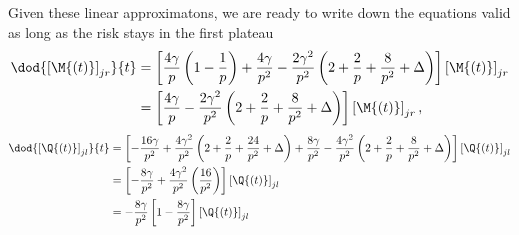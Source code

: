 Given these linear approximatons, we are ready to write down the equations valid 
as long as the risk stays in the first plateau
\begin{equation}\label{eq:Msphericalgenericpk1}\begin{split}
  \dod{\left[\M{\left(t\right)}\right]_{jr}}{t} &= 
    \left[
      \frac{4 \gamma}{p} \left(1 - \frac{1}{p}\right)
      +\frac{4 \gamma}{p^2}-\frac{2 \gamma^2}{p^2} \left(2 +\frac{2}{p} + \frac{8}{p^2} + \Delta \right)
    \right] \left[\M{\left(t\right)}\right]_{jr} \\
    &= \left[
      \frac{4 \gamma}{p} -\frac{2 \gamma^2}{p^2} \left(2 +\frac{2}{p} + \frac{8}{p^2} + \Delta \right)
    \right] \left[\M{\left(t\right)}\right]_{jr},
\end{split}\end{equation}
\begin{equation}\label{eq:Qsphericalgenericpk1}\begin{split}
  \dod{\left[\Q{\left(t\right)}\right]_{jl}}{t} &= 
    \left[
      -\frac{16 \gamma}{p^2} +\frac{4 \gamma^2}{p^2} \left(2 +\frac{2}{p} + \frac{24}{p^2} + \Delta \right)
      +\frac{8  \gamma}{p^2} -\frac{4 \gamma^2}{p^2}  \left(2 +\frac{2}{p} + \frac{8}{p^2} + \Delta \right)
    \right] \left[\Q{\left(t\right)}\right]_{jl} \\
  &= \left[
    -\frac{8 \gamma}{p^2} +\frac{4 \gamma^2}{p^2} \left(\frac{16}{p^2}\right)
  \right] \left[\Q{\left(t\right)}\right]_{jl} \\
  &= -\frac{8 \gamma}{p^2} \left[1-\frac{8\gamma}{p^2}\right] \left[\Q{\left(t\right)}\right]_{jl}
\end{split}\end{equation}

